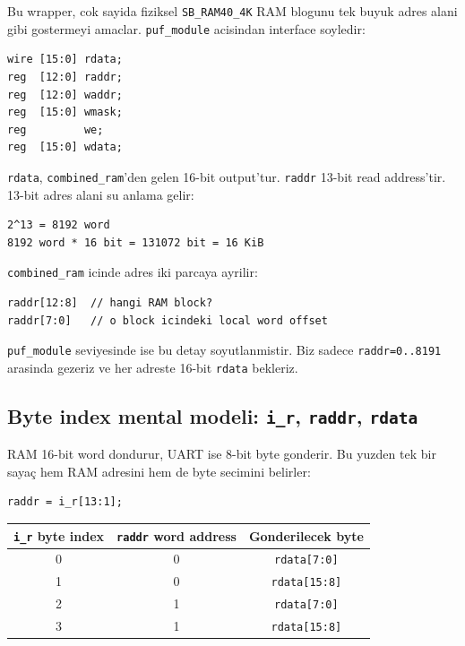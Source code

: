 \documentclass[11pt,a4paper]{article}
\begin{document}
Bu wrapper, cok sayida fiziksel \texttt{SB\_RAM40\_4K} RAM blogunu tek buyuk adres alani gibi gostermeyi amaclar. \texttt{puf\_module} acisindan interface soyledir:

\begin{lstlisting}[style=verilogstyle]
wire [15:0] rdata;
reg  [12:0] raddr;
reg  [12:0] waddr;
reg  [15:0] wmask;
reg         we;
reg  [15:0] wdata;
\end{lstlisting}

\texttt{rdata}, \texttt{combined\_ram}'den gelen 16-bit output'tur. \texttt{raddr} 13-bit read address'tir. 13-bit adres alani su anlama gelir:

\begin{lstlisting}[style=bashstyle]
2^13 = 8192 word
8192 word * 16 bit = 131072 bit = 16 KiB
\end{lstlisting}

\texttt{combined\_ram} icinde adres iki parcaya ayrilir:
\begin{lstlisting}[style=verilogstyle]
raddr[12:8]  // hangi RAM block?
raddr[7:0]   // o block icindeki local word offset
\end{lstlisting}

\texttt{puf\_module} seviyesinde ise bu detay soyutlanmistir. Biz sadece \texttt{raddr=0..8191} arasinda gezeriz ve her adreste 16-bit \texttt{rdata} bekleriz.

\subsection{Byte index mental modeli: \texttt{i\_r}, \texttt{raddr}, \texttt{rdata}}
RAM 16-bit word dondurur, UART ise 8-bit byte gonderir. Bu yuzden tek bir sayaç hem RAM adresini hem de byte secimini belirler:

\begin{lstlisting}[style=verilogstyle]
raddr = i_r[13:1];
\end{lstlisting}

\begin{center}
\begin{tabular}{ccc}
\toprule
\texttt{i\_r} byte index & \texttt{raddr} word address & Gonderilecek byte \\
\midrule
0 & 0 & \texttt{rdata[7:0]} \\
1 & 0 & \texttt{rdata[15:8]} \\
2 & 1 & \texttt{rdata[7:0]} \\
3 & 1 & \texttt{rdata[15:8]} \\
\bottomrule
\end{tabular}
\end{center}
\end{document}
